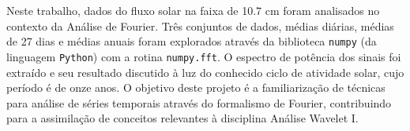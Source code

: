 
\begin{resumo}


\hypertarget{estilo:resumo}{} %

Neste trabalho, dados do fluxo solar na faixa de 10.7 cm foram analisados no contexto da Análise de Fourier. Três conjuntos de dados, médias diárias, médias de 27 dias e médias anuais foram explorados através da biblioteca \texttt{numpy} (da linguagem \texttt{Python}) com a rotina \texttt{numpy.fft}. O espectro de potência dos sinais foi extraído e seu resultado discutido à luz do conhecido ciclo de atividade solar, cujo período é de onze anos. O objetivo deste projeto é a familiarização de técnicas para análise de séries temporais através do formalismo de Fourier, contribuindo para a assimilação de conceitos relevantes à disciplina Análise Wavelet I.

 
\end{resumo}